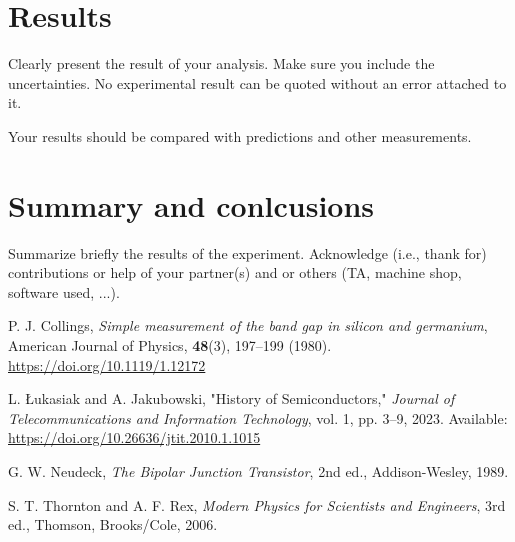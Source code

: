 \documentclass[12pt,letterpaper,twocolumn]{article}
\begin{document}

\section{Results}

Clearly present the result of your analysis. Make sure
you include the uncertainties. No experimental result
can be quoted without an error attached to it.

Your results should be compared with predictions and other
measurements.



\section{Summary and conlcusions}

Summarize briefly the results of the experiment.
Acknowledge (i.e., thank for) contributions or help
of your partner(s) and or
others (TA, machine shop, software used, ...).


\begin{thebibliography}{9}

P. J. Collings, 
\textit{Simple measurement of the band gap in silicon and germanium}, 
American Journal of Physics, \textbf{48}(3), 197--199 (1980). 
\href{https://doi.org/10.1119/1.12172}{https://doi.org/10.1119/1.12172}

L. Łukasiak and A. Jakubowski, 
"History of Semiconductors," 
\textit{Journal of Telecommunications and Information Technology}, vol. 1, pp. 3–9, 2023. 
Available: \url{https://doi.org/10.26636/jtit.2010.1.1015}

G. W. Neudeck, 
\textit{The Bipolar Junction Transistor}, 2nd ed., 
Addison-Wesley, 1989.

S. T. Thornton and A. F. Rex, 
\textit{Modern Physics for Scientists and Engineers}, 3rd ed., 
Thomson, Brooks/Cole, 2006.

\end{thebibliography}

\end{document}
